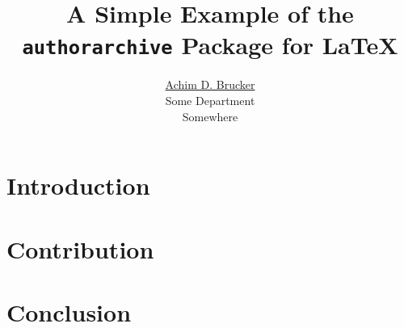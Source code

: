 \documentclass[english]{lni}
\title{A Simple Example of the \texttt{authorarchive} Package for \LaTeX}
\author{%
    \protect\href{http://www.brucker.ch/}{Achim D. Brucker}\\
    Some Department\\
    Somewhere
}
\begin{document}
  \maketitle{}

  \begin{abstract}
      \lipsum[1-2]
  \end{abstract}

  \section{Introduction}
  \lipsum[1-4]

  \section{Contribution}
  \lipsum[5-10]

  \section{Conclusion}
  \lipsum[11-12]
\end{document}
